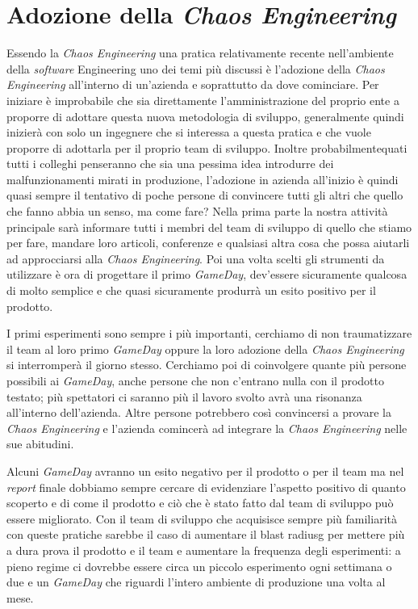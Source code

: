\section{Adozione della \textit{Chaos Engineering}}
Essendo la \textit{Chaos Engineering} una pratica relativamente recente nell'ambiente della \textit{software} Engineering uno dei temi più discussi è l'adozione della \textit{Chaos Engineering} all'interno di un'azienda e soprattutto da dove cominciare.
Per iniziare è improbabile che sia direttamente l'amministrazione del proprio ente a proporre di adottare questa nuova metodologia di sviluppo, generalmente quindi inizierà con solo un ingegnere che si interessa a questa pratica e che vuole proporre di adottarla per il proprio team di sviluppo.
Inoltre probabilmentequati tutti i colleghi penseranno che sia una pessima idea introdurre dei malfunzionamenti mirati in produzione, l'adozione in azienda all'inizio è quindi quasi sempre il tentativo di poche persone di convincere tutti gli altri che quello che fanno abbia un senso, ma come fare?
Nella prima parte la nostra attività principale sarà informare tutti i membri del team di sviluppo di quello che stiamo per fare, mandare loro articoli, conferenze e qualsiasi altra cosa che possa aiutarli ad approcciarsi alla \textit{Chaos Engineering}.
Poi una volta scelti gli strumenti da utilizzare è ora di progettare il primo \textit{GameDay}, dev'essere sicuramente qualcosa di molto semplice e che quasi sicuramente produrrà un esito positivo per il prodotto.

I primi esperimenti sono sempre i più importanti, cerchiamo di non traumatizzare il team al loro primo \textit{GameDay} oppure la loro adozione della \textit{Chaos Engineering} si interromperà il giorno stesso.
Cerchiamo poi di coinvolgere quante più persone possibili ai \textit{GameDay}, anche persone che non c'entrano nulla con il prodotto testato; più spettatori ci saranno più il lavoro svolto avrà una risonanza all'interno dell'azienda.
Altre persone potrebbero così convincersi a provare la \textit{Chaos Engineering} e l'azienda comincerà ad integrare la \textit{Chaos Engineering} nelle sue abitudini.

Alcuni \textit{GameDay} avranno un esito negativo per il prodotto o per il team ma nel \textit{report} finale dobbiamo sempre cercare di evidenziare l'aspetto positivo di quanto scoperto e di come il prodotto e ciò che è stato fatto dal team di sviluppo può essere migliorato.
Con il team di sviluppo che acquisisce sempre più familiarità con queste pratiche sarebbe il caso di aumentare il blast radiusg per mettere più a dura prova il prodotto e il team e aumentare la frequenza degli esperimenti: a pieno regime ci dovrebbe essere circa un piccolo esperimento ogni settimana o due e un \textit{GameDay} che riguardi l'intero ambiente di produzione una volta al mese.

